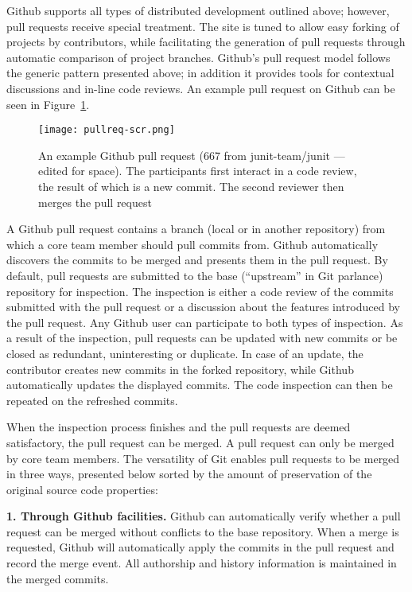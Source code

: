 \documentclass{sig-alternate}
\begin{document}
Github supports all types of distributed development outlined above; however,
pull requests receive special treatment. The site is tuned to allow easy forking
of projects by contributors, while facilitating the generation of pull requests
through automatic comparison of project branches.
Github's pull request model follows the generic pattern presented above; in
addition it provides tools for contextual discussions and in-line code reviews.
An example pull request on Github can be seen in Figure~\ref{fig:pullreq-scr}.

\begin{figure}[t]
  \centering
   \texttt{[image: pullreq-scr.png]}
   \caption{An example Github pull request (667 from junit-team/junit --- edited for space). The
   participants first interact in a code review, the result of which is
   a new commit. The second reviewer then merges the pull request}
   \label{fig:pullreq-scr}
\end{figure}

A Github pull request contains a branch (local or in another repository) from
which a core team member should pull commits from. Github automatically
discovers the commits to be merged and presents them in the pull request. By
default, pull requests are submitted to the base (``upstream'' in Git parlance)
repository for inspection. The
inspection is either a code review of the commits submitted with the pull
request or a discussion about the features introduced by the pull request. Any
Github user can participate to both types of inspection. As a result of the
inspection, pull requests can be updated with new commits or be closed as
redundant, uninteresting or duplicate. In case of an update, the contributor
creates new commits in the forked repository, while Github automatically
updates the displayed commits. The code inspection can then be repeated on the
refreshed commits.

When the inspection process finishes and the pull requests are deemed
satisfactory, the pull request can be merged. A pull request can only be merged
by core team members. The versatility of Git enables pull requests to be
merged in three ways, presented below sorted by the amount of preservation of
the original source code properties:

\textbf{1. Through Github facilities.}
    Github can automatically verify whether a
    pull request can be merged without conflicts to the base repository. When a
    merge is requested, Github will automatically apply the commits in the pull
    request and record the merge event. All authorship and history information
    is maintained in the merged commits.
\end{document}
